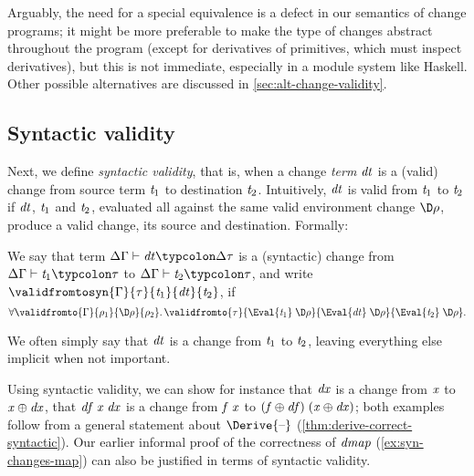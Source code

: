 Arguably, the need for a special equivalence is a defect in our
semantics of change programs; it might be more preferable to make the type of
changes abstract throughout the program (except for derivatives of primitives,
which must inspect derivatives), but this is not immediate, especially in a
module system like Haskell.
Other possible alternatives are discussed in \cref{sec:alt-change-validity}.

\subsection{Syntactic validity}
\label{sec:denot-syntactic-validity}
Next, we define \emph{syntactic validity}, that is,
when a change \emph{term} \ensuremath{\Varid{dt}} is a (valid) change
from source term \ensuremath{\Varid{t}_{1}} to destination \ensuremath{\Varid{t}_{2}}. Intuitively, \ensuremath{\Varid{dt}} is valid
from \ensuremath{\Varid{t}_{1}} to \ensuremath{\Varid{t}_{2}} if \ensuremath{\Varid{dt}}, \ensuremath{\Varid{t}_{1}} and \ensuremath{\Varid{t}_{2}}, evaluated all
against the same valid environment change \ensuremath{\D\rho}, produce a
valid change, its source and destination. Formally:
\begin{definition}
  \label{def:syntactic-validity}
  We say that term \ensuremath{\Delta \Gamma\vdash\Varid{dt}\typcolon\Delta \tau} is a (syntactic)
  change from \ensuremath{\Delta \Gamma\vdash\Varid{t}_{1}\typcolon\tau} to \ensuremath{\Delta \Gamma\vdash\Varid{t}_{2}\typcolon\tau}, and write
  \ensuremath{\validfromtosyn{\Gamma}{\tau}{\Varid{t}_{1}}{\Varid{dt}}{\Varid{t}_{2}}}, if
  \[\ensuremath{\forall \validfromto{\Gamma}{\rho_{1}}{\D\rho}{\rho_{2}}\hsforall \hsdot{\circ }{\mathpunct{.}}\validfromto{\tau}{\Eval{\Varid{t}_{1}}\;\D\rho}{\Eval{\Varid{dt}}\;\D\rho}{\Eval{\Varid{t}_{2}}\;\D\rho}}.\]
\end{definition}
\begin{notation}
  We often simply say that \ensuremath{\Varid{dt}} is a change from \ensuremath{\Varid{t}_{1}} to \ensuremath{\Varid{t}_{2}},
  leaving everything else implicit when not important.
\end{notation}

Using syntactic validity, we can show for instance that \ensuremath{\Varid{dx}} is a
change from \ensuremath{\Varid{x}} to \ensuremath{\Varid{x}\oplus \Varid{dx}}, that \ensuremath{\Varid{df}\;\Varid{x}\;\Varid{dx}} is a change
from \ensuremath{\Varid{f}\;\Varid{x}} to \ensuremath{(\Varid{f}\oplus \Varid{df})\;(\Varid{x}\oplus \Varid{dx})}; both examples
follow from a general statement about \ensuremath{\Derive{\text{\textendash}}}
(\cref{thm:derive-correct-syntactic}). Our earlier informal proof
of the correctness of \ensuremath{\Varid{dmap}} (\cref{ex:syn-changes-map}) can also
be justified in terms of syntactic validity.


